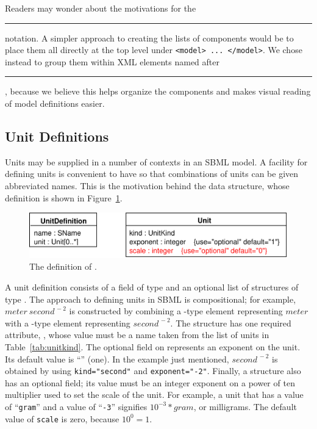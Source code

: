 \documentclass[10pt]{cekarticle}
\newcommand{\vref}[1]{\ref{#1}}
\newcommand{\changed}[1]{\textcolor{BrickRed}{#1}}
\begin{document}
Readers may wonder about the motivations for the
\rule{0.5in}{0.5pt} notation.  A simpler approach to
creating the lists of components would be to place them all directly
at the top level under \texttt{<model> ... </model>}.  We chose instead to
group them within XML elements named after
\rule{0.5in}{0.5pt}, because we believe this helps
organize the components and makes visual reading of model definitions
easier.


\subsection{Unit Definitions}
\label{sec:unitdefinitions}

Units may be supplied in a number of contexts in an SBML model.  A facility
for defining units is convenient to have so that combinations of units can
be given abbreviated names.  This is the motivation behind the
 data structure, whose definition is shown in
Figure~\vref{fig:unitdefinition}.

\begin{figure}[htb]
  \centering
  \includegraphics[scale = 0.65]{unitdefinition}
  \vspace*{-4pt}
  \caption{The definition of .}
  \label{fig:unitdefinition}
\end{figure}

A unit definition consists of a  field of type 
and an optional list of structures of type .  The approach to
defining units in SBML is compositional; for example, $meter\ 
second^{\,-2}$ is constructed by combining a -type element
representing $meter$ with a -type element representing
$second^{\,-2}$.  \changed{The \class{Unit} structure has one required
  attribute, \attrib{kind}, whose value must be a name taken from the list
  of units in Table~\ref{tab:unitkind}.  The optional \attrib{exponent}
  field on \class{Unit} represents an exponent on the unit.}  Its default
value is ``\attribvalue{1}'' (one).  In the example just mentioned,
$second^{\,-2}$ is obtained by using \texttt{kind="second"} and
\texttt{exponent="-2"}.  \changed{Finally, a \class{Unit} structure also
  has an optional \attrib{scale} field; its value must be an integer
  exponent on a power of ten multiplier used to set the scale of the unit.}
For example, a unit that has a \attrib{kind} value of ``\texttt{gram}'' and
a \attrib{scale} value of ``\texttt{-3}'' signifies $10^{-3} * gram$, or
milligrams.  \changed{The default value of \texttt{scale} is zero, because
  $10^0 = 1$.}
\end{document}
